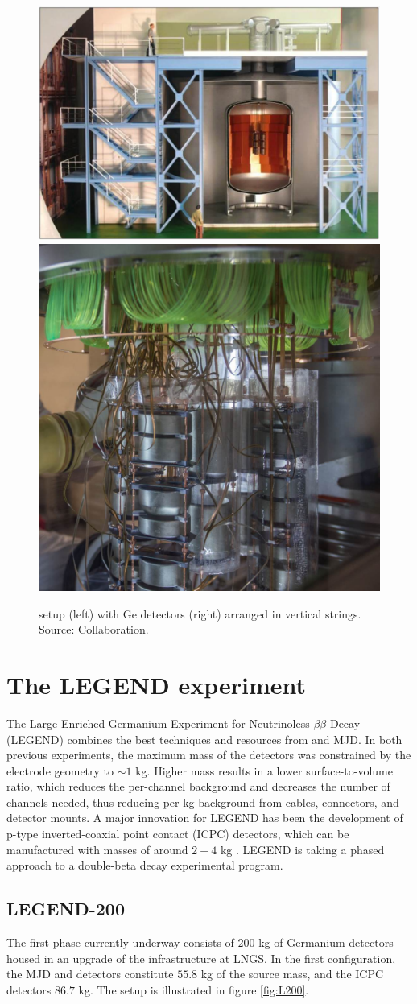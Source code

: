 \begin{figure}
\centering
\includegraphics[height=0.385\columnwidth]{ch2/figs/gerda_setup.pdf}
\qquad
\includegraphics[height=0.385\columnwidth]{ch2/figs/gerdastrings.pdf}
\caption{{\Gerda} setup (left) with Ge detectors (right) arranged in vertical strings. Source: {\Gerda} Collaboration.}
\label{ch2_fig_gerda_setup}
\end{figure}
  
\section{The LEGEND experiment}
The Large Enriched Germanium Experiment for Neutrinoless $\beta\beta$ Decay (LEGEND) combines the best techniques and resources from {\Gerda} and MJD. In both previous experiments, the maximum mass of the detectors was constrained by the electrode geometry to $\sim1$ kg. Higher mass results in a lower surface-to-volume ratio, which reduces the per-channel background and decreases the number of channels needed, thus reducing per-kg background from cables, connectors, and detector mounts. A major innovation for LEGEND has been the development of p-type inverted-coaxial point contact (ICPC) detectors, which can be manufactured with masses of around $2-4$ kg \cite{COOPER201125}. LEGEND is taking a phased approach to a double-beta decay experimental program.

\subsection{LEGEND-200}
The first phase currently underway consists of $200$ kg of Germanium detectors housed in an upgrade of the {\Gerda} infrastructure at LNGS. In the first configuration, the MJD and {\Gerda} detectors constitute $55.8$ kg of the source mass, and the ICPC detectors $86.7$ kg. The setup is illustrated in figure \ref{fig:L200}. 

